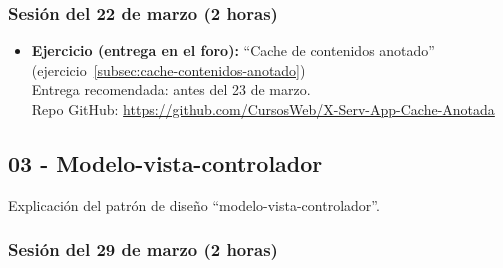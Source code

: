 \documentclass[a4paper,12pt]{article}
\begin{document}
\subsubsection{Sesión del 22 de marzo (2 horas)}

\begin{itemize}
\item \textbf{Ejercicio (entrega en el foro):} ``Cache de contenidos anotado'' (ejercicio~\ref{subsec:cache-contenidos-anotado}) \\
  Entrega recomendada: antes del 23 de marzo. \\
  Repo GitHub: \url{https://github.com/CursosWeb/X-Serv-App-Cache-Anotada}
\end{itemize}



\subsection{03 - Modelo-vista-controlador}

Explicación del patrón de diseño ``modelo-vista-controlador''.

\subsubsection{Sesión del 29 de marzo (2 horas)}
\end{document}
